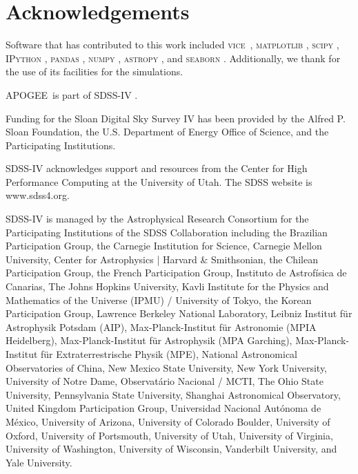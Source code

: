 \documentclass[fleqn,
usenatbib]{mnras}
\newcommand{\VICE}{\textsc{vice}}
\newcommand{\apogee}{APOGEE}
\begin{document}
\section*{Acknowledgements}

Software that has contributed to this work included  
\VICE~\citep{JW20, james+21},
\textsc{matplotlib} \citep{matplotlib},
\textsc{scipy} \citep{scipy},
\textsc{IPython} \citep{ipy},
\textsc{pandas} \citep{pandas},
\textsc{numpy} \citep{numpy},
\textsc{astropy} \citep{astropy:2013, astropy:2018, astropy:2022},
and 
\textsc{seaborn} \citep{seaborn}
.
Additionally, we thank \citet{OhioSupercomputerCenter1987} for the use of its facilities for the simulations. 

\apogee\ is part of SDSS-IV \citep{sloan_telescope, apogee_instrumentation, sdss_iv_overview, sdss17, apogee17, aspcap}.

Funding for the Sloan Digital Sky 
Survey IV has been provided by the 
Alfred P. Sloan Foundation, the U.S. 
Department of Energy Office of 
Science, and the Participating 
Institutions. 

SDSS-IV acknowledges support and 
resources from the Center for High 
Performance Computing  at the 
University of Utah. The SDSS 
website is www.sdss4.org.

SDSS-IV is managed by the 
Astrophysical Research Consortium 
for the Participating Institutions 
of the SDSS Collaboration including 
the Brazilian Participation Group, 
the Carnegie Institution for Science, 
Carnegie Mellon University, Center for 
Astrophysics | Harvard \& 
Smithsonian, the Chilean Participation 
Group, the French Participation Group, 
Instituto de Astrof\'isica de 
Canarias, The Johns Hopkins 
University, Kavli Institute for the 
Physics and Mathematics of the 
Universe (IPMU) / University of 
Tokyo, the Korean Participation Group, 
Lawrence Berkeley National Laboratory, 
Leibniz Institut f\"ur Astrophysik 
Potsdam (AIP),  Max-Planck-Institut 
f\"ur Astronomie (MPIA Heidelberg), 
Max-Planck-Institut f\"ur 
Astrophysik (MPA Garching), 
Max-Planck-Institut f\"ur 
Extraterrestrische Physik (MPE), 
National Astronomical Observatories of 
China, New Mexico State University, 
New York University, University of 
Notre Dame, Observat\'ario 
Nacional / MCTI, The Ohio State 
University, Pennsylvania State 
University, Shanghai 
Astronomical Observatory, United 
Kingdom Participation Group, 
Universidad Nacional Aut\'onoma 
de M\'exico, University of Arizona, 
University of Colorado Boulder, 
University of Oxford, University of 
Portsmouth, University of Utah, 
University of Virginia, University 
of Washington, University of 
Wisconsin, Vanderbilt University, 
and Yale University.
\end{document}
